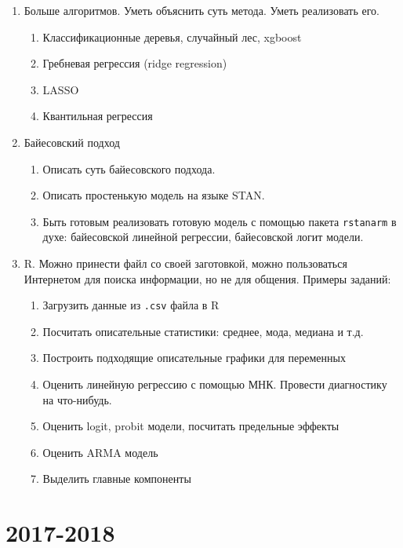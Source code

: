 \documentclass[12pt, a4paper]{article}
\begin{document}
\begin{enumerate}
\item Больше алгоритмов. Уметь объяснить суть метода. Уметь реализовать его. %
\begin{enumerate}
\item Классификационные деревья, случайный лес, xgboost
\item Гребневая регрессия (ridge regression)
\item LASSO
\item Квантильная регрессия
\end{enumerate}

\item Байесовский подход
\begin{enumerate}
\item Описать суть байесовского подхода.
\item Описать простенькую модель на языке STAN.
\item Быть готовым реализовать готовую модель с помощью пакета \verb|rstanarm| в духе: байесовской линейной регрессии, байесовской логит модели.
\end{enumerate}

\item R. Можно принести файл со своей заготовкой, можно пользоваться Интернетом для поиска информации, но не для общения. Примеры заданий:
\begin{enumerate}
\item Загрузить данные из \verb|.csv| файла в R
\item Посчитать описательные статистики: среднее, мода, медиана и т.д.
\item Построить подходящие описательные графики для переменных
\item Оценить линейную регрессию с помощью МНК. Провести диагностику на что-нибудь.
\item Оценить logit, probit модели, посчитать предельные эффекты
\item Оценить ARMA модель
\item Выделить главные компоненты
\end{enumerate}


\end{enumerate}


\section{2017-2018}


\end{document}
